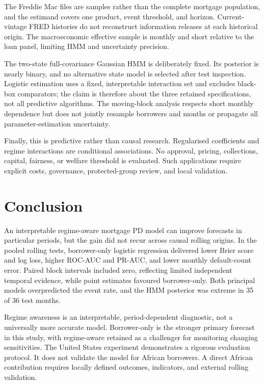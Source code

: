 \documentclass[12pt]{article}
\begin{document}
The Freddie Mac files are samples rather than the complete mortgage population, and the estimand covers one product, event threshold, and horizon. Current-vintage FRED histories do not reconstruct information releases at each historical origin. The macroeconomic effective sample is monthly and short relative to the loan panel, limiting HMM and uncertainty precision.

The two-state full-covariance Gaussian HMM is deliberately fixed. Its posterior is nearly binary, and no alternative state model is selected after test inspection. Logistic estimation uses a fixed, interpretable interaction set and excludes black-box comparators; the claim is therefore about the three retained specifications, not all predictive algorithms. The moving-block analysis respects short monthly dependence but does not jointly resample borrowers and months or propagate all parameter-estimation uncertainty.

Finally, this is predictive rather than causal research. Regularised coefficients and regime interactions are conditional associations. No approval, pricing, collections, capital, fairness, or welfare threshold is evaluated. Such applications require explicit costs, governance, protected-group review, and local validation.

\section{Conclusion}

An interpretable regime-aware mortgage PD model can improve forecasts in particular periods, but the gain did not recur across causal rolling origins. In the pooled rolling tests, borrower-only logistic regression delivered lower Brier score and log loss, higher ROC-AUC and PR-AUC, and lower monthly default-count error. Paired block intervals included zero, reflecting limited independent temporal evidence, while point estimates favoured borrower-only. Both principal models overpredicted the event rate, and the HMM posterior was extreme in 35 of 36 test months.

Regime awareness is an interpretable, period-dependent diagnostic, not a universally more accurate model. Borrower-only is the stronger primary forecast in this study, with regime-aware retained as a challenger for monitoring changing sensitivities. The United States experiment demonstrates a rigorous evaluation protocol. It does not validate the model for African borrowers. A direct African contribution requires locally defined outcomes, indicators, and external rolling validation.





\end{document}
